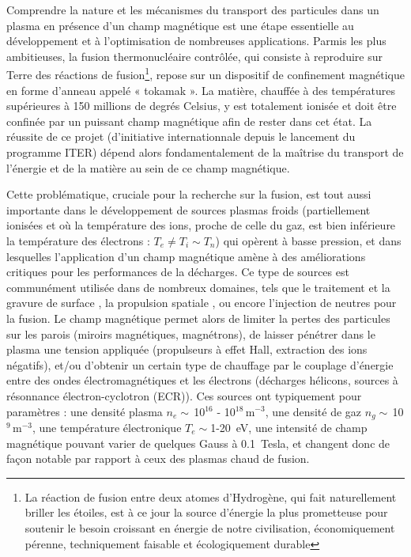 
\begin{refsection}

Comprendre la nature et les mécanismes du transport des particules dans un
plasma en présence d'un champ magnétique est une étape essentielle au
développement et à l'optimisation de nombreuses applications.
Parmis les plus ambitieuses, la fusion thermonucléaire contrôlée, qui
consiste à reproduire sur Terre des réactions de fusion\footnote{La réaction de fusion entre deux atomes d'Hydrogène, 
qui fait naturellement briller les étoiles, est à ce jour la source d'énergie
la plus prometteuse pour soutenir le besoin croissant en énergie de notre civilisation,
économiquement pérenne, techniquement faisable et écologiquement durable}, repose sur un
dispositif de confinement magnétique en forme d'anneau appelé « tokamak ».
La matière, chauffée à des températures supérieures à 150 millions de degrés
Celsius, y est totalement ionisée et doit être confinée par un puissant champ magnétique afin
de rester dans cet état. La réussite de ce projet (d'initiative
internationnale depuis le lancement du programme ITER) dépend alors
fondamentalement de la maîtrise du transport de l'énergie et de la matière au
sein de ce champ magnétique.

Cette problématique, cruciale pour la recherche sur la fusion, est tout aussi
importante dans le développement de sources plasmas froids (partiellement
ionisées et où la température des ions, proche de celle du gaz,
est bien inférieure la température des électrons : $T_e\neq T_i\sim
T_n$) qui opèrent à basse pression, et dans lesquelles l'application d'un champ
magnétique amène à des améliorations critiques pour les performances de la
décharges. Ce type de sources est communément utilisée dans de
nombreux domaines, tels que le traitement et la gravure de surface
\parencite{Lie}, la propulsion spatiale \parencite{Zhu}, ou encore l'injection de neutres pour la
fusion. Le champ magnétique permet alors de limiter la pertes des particules sur
les parois (miroirs magnétiques, magnétrons), de laisser pénétrer dans le
plasma une tension appliquée (propulseurs à effet Hall, extraction
des ions négatifs), et/ou d'obtenir un certain type de chauffage par le couplage
d'énergie entre des ondes électromagnétiques et les électrons (décharges
hélicons, sources à résonnance électron-cyclotron (ECR)). Ces sources ont
typiquement pour paramètres : une densité plasma $n_e\sim\,$10$^16$ -
10$^18\,$m$^{-3}$, une densité de gaz $n_g\sim\,$10$^9\,$m$^{-3}$, une
température électronique $T_e\sim$1-20~eV, une intensité de champ magnétique
pouvant varier de quelques Gauss à 0.1~Tesla, et changent donc de façon notable
par rapport à ceux des plasmas chaud de fusion.


\end{refsection}
